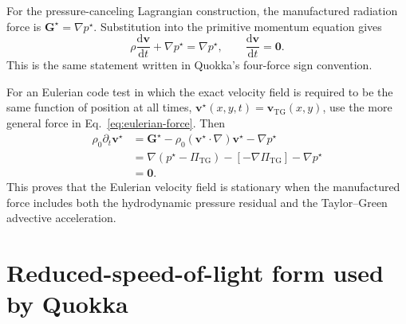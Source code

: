 \documentclass[11pt]{article}
\newcommand{\dd}{\mathrm{d}}
\newcommand{\Grad}{\nabla}
\newcommand{\Gmom}{\bm{G}}
\begin{document}
For the pressure-canceling Lagrangian construction, the manufactured radiation
force is \(\Gmom^\star=\Grad p^\star\).  Substitution into the primitive
momentum equation gives
\begin{equation}
  \rho\frac{\dd\bm{v}}{\dd t}+\Grad p^\star=\Grad p^\star,
  \qquad
  \frac{\dd\bm{v}}{\dd t}=\bm{0}.
  \label{eq:velocity-lagrangian-proof}
\end{equation}
This is the same statement written in Quokka's four-force sign convention.

For an Eulerian code test in which the exact velocity field is required to be
the same function of position at all times,
\(\bm{v}^\star(x,y,t)=\bm{v}_{\mathrm{TG}}(x,y)\), use the more general force
in Eq.~\eqref{eq:eulerian-force}.  Then
\begin{align}
  \rho_0\partial_t\bm{v}^\star
  &=
  \Gmom^\star
  - \rho_0(\bm{v}^\star\cdot\Grad)\bm{v}^\star
  - \Grad p^\star \nonumber\\
  &=
  \Grad(p^\star-\Pi_{\mathrm{TG}})
  - \left[-\Grad\Pi_{\mathrm{TG}}\right]
  - \Grad p^\star \nonumber\\
  &= \bm{0}.
  \label{eq:velocity-eulerian-proof}
\end{align}
This proves that the Eulerian velocity field is stationary when the
manufactured force includes both the hydrodynamic pressure residual and the
Taylor--Green advective acceleration.

\section{Reduced-speed-of-light form used by Quokka}
\end{document}
